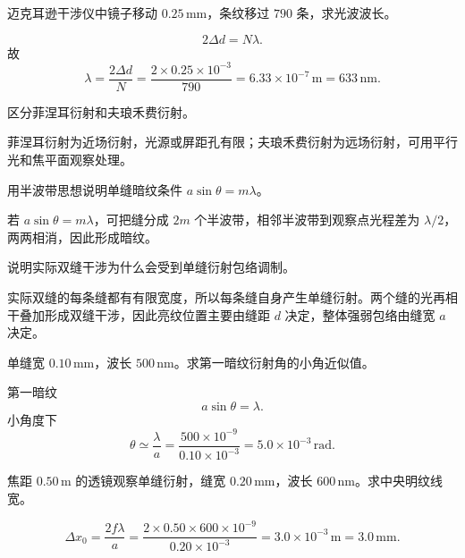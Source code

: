 \begin{exercise}[level=standard]
迈克耳逊干涉仪中镜子移动 $0.25\,\mathrm{mm}$，条纹移过 $790$ 条，求光波波长。
\begin{solution}
\[
  2\Delta d=N\lambda.
\]
故
\[
  \lambda=\frac{2\Delta d}{N}
  =\frac{2\times0.25\times10^{-3}}{790}
  =6.33\times10^{-7}\,\mathrm{m}=633\,\mathrm{nm}.
\]
\end{solution}
\end{exercise}

\begin{exercise}[level=basic]
区分菲涅耳衍射和夫琅禾费衍射。
\begin{solution}
菲涅耳衍射为近场衍射，光源或屏距孔有限；夫琅禾费衍射为远场衍射，可用平行光和焦平面观察处理。
\end{solution}
\end{exercise}

\begin{exercise}[level=basic]
用半波带思想说明单缝暗纹条件 $a\sin\theta=m\lambda$。
\begin{solution}
若 $a\sin\theta=m\lambda$，可把缝分成 $2m$ 个半波带，相邻半波带到观察点光程差为 $\lambda/2$，两两相消，因此形成暗纹。
\end{solution}
\end{exercise}

\begin{exercise}[level=basic]
说明实际双缝干涉为什么会受到单缝衍射包络调制。
\begin{solution}
实际双缝的每条缝都有有限宽度，所以每条缝自身产生单缝衍射。两个缝的光再相干叠加形成双缝干涉，因此亮纹位置主要由缝距 $d$ 决定，整体强弱包络由缝宽 $a$ 决定。
\end{solution}
\end{exercise}

\begin{exercise}[level=standard]
单缝宽 $0.10\,\mathrm{mm}$，波长 $500\,\mathrm{nm}$。求第一暗纹衍射角的小角近似值。
\begin{solution}
第一暗纹
\[
  a\sin\theta=\lambda.
\]
小角度下
\[
  \theta\simeq\frac{\lambda}{a}
  =\frac{500\times10^{-9}}{0.10\times10^{-3}}
  =5.0\times10^{-3}\,\mathrm{rad}.
\]
\end{solution}
\end{exercise}

\begin{exercise}[level=standard]
焦距 $0.50\,\mathrm{m}$ 的透镜观察单缝衍射，缝宽 $0.20\,\mathrm{mm}$，波长 $600\,\mathrm{nm}$。求中央明纹线宽。
\begin{solution}
\[
  \Delta x_0=\frac{2f\lambda}{a}
  =\frac{2\times0.50\times600\times10^{-9}}{0.20\times10^{-3}}
  =3.0\times10^{-3}\,\mathrm{m}=3.0\,\mathrm{mm}.
\]
\end{solution}
\end{exercise}

